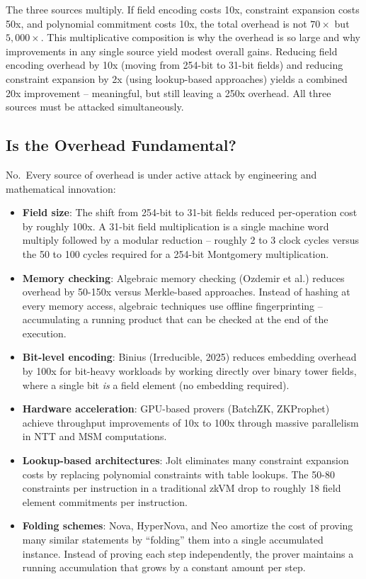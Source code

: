 \documentclass[
  11pt,
  openany]{report}
\providecommand{\tightlist}{%
  \setlength{\itemsep}{0pt}\setlength{\parskip}{0pt}}
\renewcommand{\textbf}[1]{{\bfseries\color{MidnightBold}#1}}
\begin{document}
The three sources multiply. If field encoding costs 10x, constraint expansion
costs 50x, and polynomial commitment costs 10x, the total overhead is not
\(70\times\) but \(5{,}000\times\). This multiplicative composition is why the
overhead is so large and why improvements in any single source yield modest
overall gains. Reducing field encoding overhead by 10x (moving from 254-bit to
31-bit fields) and reducing constraint expansion by 2x (using lookup-based
approaches) yields a combined 20x improvement -- meaningful, but still leaving a
250x overhead. All three sources must be attacked simultaneously.

\subsection{Is the Overhead Fundamental?}\label{is-the-overhead-fundamental}

No.~Every source of overhead is under active attack by engineering and
mathematical innovation:

\begin{itemize}
\tightlist
\item
  \textbf{Field size}: The shift from 254-bit to 31-bit fields reduced
  per-operation cost by roughly 100x. A 31-bit field multiplication is a single
  machine word multiply followed by a modular reduction -- roughly 2 to 3 clock
  cycles versus the 50 to 100 cycles required for a 254-bit Montgomery
  multiplication.
\item
  \textbf{Memory checking}: Algebraic memory checking (Ozdemir et al.) reduces
  overhead by 50-150x versus Merkle-based approaches. Instead of hashing at
  every memory access, algebraic techniques use offline fingerprinting --
  accumulating a running product that can be checked at the end of the
  execution.
\item
  \textbf{Bit-level encoding}: Binius (Irreducible, 2025) reduces embedding
  overhead by 100x for bit-heavy workloads by working directly over binary tower
  fields, where a single bit \emph{is} a field element (no embedding required).
\item
  \textbf{Hardware acceleration}: GPU-based provers (BatchZK, ZKProphet) achieve
  throughput improvements of 10x to 100x through massive parallelism in NTT and
  MSM computations.
\item
  \textbf{Lookup-based architectures}: Jolt eliminates many constraint expansion
  costs by replacing polynomial constraints with table lookups. The 50-80
  constraints per instruction in a traditional zkVM drop to roughly 18 field
  element commitments per instruction.
\item
  \textbf{Folding schemes}: Nova, HyperNova, and Neo amortize the cost of
  proving many similar statements by ``folding'' them into a single accumulated
  instance. Instead of proving each step independently, the prover maintains a
  running accumulation that grows by a constant amount per step.
\end{itemize}
\end{document}

